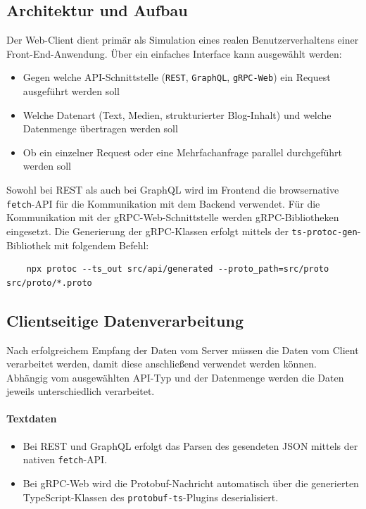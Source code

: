 \begin{enumerate}
\subsection*{Architektur und Aufbau}
Der Web-Client dient primär als Simulation eines realen Benutzerverhaltens einer Front-End-Anwendung. Über ein einfaches Interface kann ausgewählt werden:
\begin{itemize}
	\item Gegen welche API-Schnittstelle (\texttt{REST}, \texttt{GraphQL}, \texttt{gRPC-Web}) ein Request ausgeführt werden soll
	\item Welche Datenart (Text, Medien, strukturierter Blog-Inhalt) und welche Datenmenge übertragen werden soll
	\item Ob ein einzelner Request oder eine Mehrfachanfrage parallel durchgeführt werden soll
\end{itemize}

Sowohl bei REST als auch bei GraphQL wird im Frontend die browsernative \texttt{fetch}-API für die Kommunikation mit dem Backend verwendet.  
Für die Kommunikation mit der gRPC-Web-Schnittstelle werden gRPC-Bibliotheken eingesetzt. Die Generierung der gRPC-Klassen erfolgt mittels der \texttt{ts-protoc-gen}-Bibliothek mit folgendem Befehl:

\begin{verbatim}
	npx protoc --ts_out src/api/generated --proto_path=src/proto src/proto/*.proto
\end{verbatim}

\subsection*{Clientseitige Datenverarbeitung}
Nach erfolgreichem Empfang der Daten vom Server müssen die Daten vom Client verarbeitet werden, damit diese anschließend verwendet werden können. Abhängig vom ausgewählten API-Typ und der Datenmenge werden die Daten jeweils unterschiedlich verarbeitet. 

\paragraph{Textdaten}
\begin{itemize}
	\item Bei REST und GraphQL erfolgt das Parsen des gesendeten JSON mittels der nativen \texttt{fetch}-API.
	\item Bei gRPC-Web wird die Protobuf-Nachricht automatisch über die generierten TypeScript-Klassen des \texttt{protobuf-ts}-Plugins deserialisiert.
\end{itemize}


\end{enumerate}
